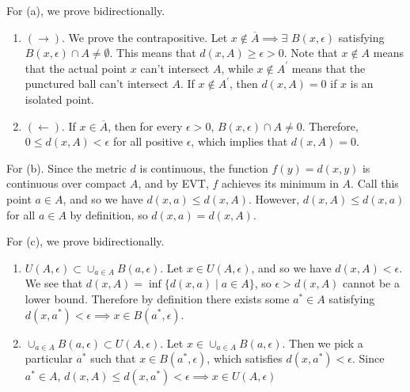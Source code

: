   \begin{solution}
    For (a), we prove bidirectionally. 
    \begin{enumerate}
      \item $(\rightarrow)$. We prove the contrapositive. Let $x \not\in \overline{A} \implies \exists$ $B(x, \epsilon)$ satisfying $B(x, \epsilon) \cap A \neq \emptyset$. This means that $d(x, A) \geq \epsilon > 0$. Note that $x \not\in A$ means that the actual point $x$ can't intersect $A$, while $x \not\in A^\prime$ means that the punctured ball can't intersect $A$. If $x \not\in A^\prime$, then $d(x, A) = 0$ if $x$ is an isolated point. 

      \item $(\leftarrow)$. If $x \in \overline{A}$, then for every $\epsilon > 0$, $B(x, \epsilon) \cap A \neq 0$. Therefore, $0 \leq d(x, A) < \epsilon$ for all positive $\epsilon$, which implies that $d(x, A) = 0$. 
    \end{enumerate}
    For (b). Since the metric $d$ is continuous, the function $f(y) = d(x, y)$ is continuous over compact $A$, and by EVT, $f$ achieves its minimum in $A$. Call this point $a \in A$, and so we have $d(x, a) \leq d(x, A)$. However, $d(x, A) \leq d(x, a)$ for all $a \in A$ by definition, so $d(x, a) = d(x, A)$. 

    For (c), we prove bidirectionally. 
    \begin{enumerate}
      \item $U(A, \epsilon) \subset \cup_{a \in A} B(a, \epsilon)$. Let $x \in U(A, \epsilon)$, and so we have $d(x, A) < \epsilon$. We see that $d(x, A) = \inf \{d(x, a) \mid a \in A\}$, so $\epsilon > d(x, A)$ cannot be a lower bound. Therefore by definition there exists some $a^\ast \in A$ satisfying $d(x, a^\ast) < \epsilon \implies x \in B(a^\ast, \epsilon)$. 

      \item $\cup_{a \in A} B(a, \epsilon) \subset U(A, \epsilon)$. Let $x \in \cup_{a \in A} B(a, \epsilon)$. Then we pick a particular $a^\ast$ such that $x \in B(a^\ast, \epsilon)$, which satisfies $d(x, a^\ast) < \epsilon$. Since $a^\ast \in A$, $d(x, A) \leq d(x, a^\ast) < \epsilon \implies x \in U(A, \epsilon)$
    \end{enumerate}


\end{solution}
